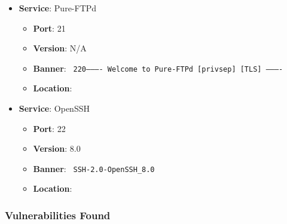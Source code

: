 \documentclass{article}
\begin{document}
\begin{itemize}
    
        \item \textbf{Service}: Pure-FTPd
        \begin{itemize}
            \item \textbf{Port}: 21
            \item \textbf{Version}:  N/A 
            \item \textbf{Banner}: \texttt{
                220---------- Welcome to Pure-FTPd [privsep] [TLS] ----------
            }
            \item \textbf{Location}: \href{  }{  }
        \end{itemize}
    
        \item \textbf{Service}: OpenSSH
        \begin{itemize}
            \item \textbf{Port}: 22
            \item \textbf{Version}:  8.0 
            \item \textbf{Banner}: \texttt{
                SSH-2.0-OpenSSH\_8.0
            }
            \item \textbf{Location}: \href{  }{  }
        \end{itemize}
    
\end{itemize}


\subsubsection*{Vulnerabilities Found}
\end{document}
